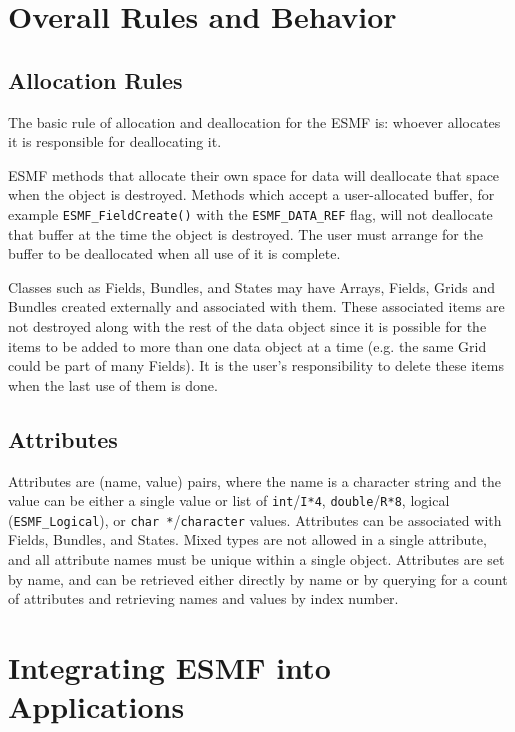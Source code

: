 \section{Overall Rules and Behavior}

\subsection{Allocation Rules}

The basic rule of allocation and deallocation for the ESMF is:
whoever allocates it is responsible for deallocating it.

ESMF methods that allocate their own space for data will
deallocate that space when the object is destroyed. 
Methods which accept a user-allocated buffer, for example
{\tt ESMF\_FieldCreate()} with the {\tt ESMF\_DATA\_REF} flag,
will not deallocate that buffer at the time the object is
destroyed.  The user must arrange for the buffer to be deallocated
when all use of it is complete.

Classes such as Fields, Bundles, and States may have Arrays, 
Fields, Grids and Bundles created externally and associated with
them.  These associated items are not destroyed along with the rest  
of the data object since it is possible for the items to be added 
to more than one data object at a time (e.g. the same Grid could 
be part of many Fields).  It is the user's responsibility to delete 
these items when the last use of them is done.

\subsection{Attributes}

Attributes are (name, value) pairs, where
the name is a character string and the value can be either a single
value or list of {\tt int}/{\tt I*4}, {\tt double}/{\tt R*8},
logical ({\tt ESMF\_Logical}), or {\tt char *}/{\tt character} values.
Attributes can be associated with Fields, Bundles, and States. 
Mixed types are not allowed in a single attribute, and all attribute
names must be unique within a single object.    Attributes are set
by name, and can be retrieved either directly by name or by querying
for a count of attributes and retrieving names and values
by index number.

\section{Integrating ESMF into Applications}

